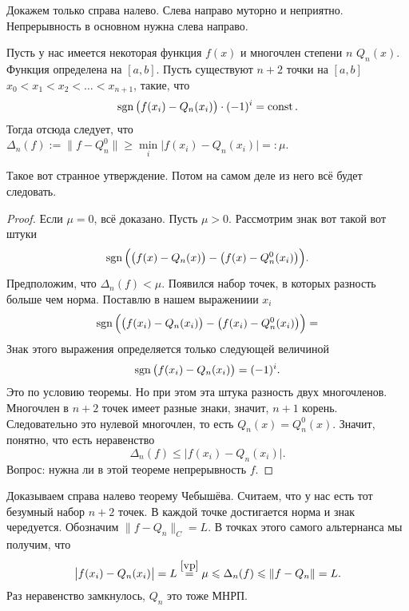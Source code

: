 \begin{Proof}
  Докажем только справа налево. Слева направо муторно и неприятно. Непрерывность в основном нужна слева направо.

  \begin{The}\label{vp}
    Пусть у нас имеется некоторая функция $f(x)$ и многочлен степени $n$ $Q_n(x)$. Функция определена на $[a,b]$. Пусть существуют $n+2$ точки на $[a,b]$ $x_0<x_1<x_2<\dots<x_{n+1}$, такие, что 
    \[
      \sgn\big( f(x_i) - Q_n(x_i)\big)\cdot (-1)^i = \const.
    \]
    Тогда отсюда следует, что $\Delta_n(f):=\|f-Q_n^0\|\ge \min\limits_i\big|f(x_i)-Q_n(x_i)\big|=:\mu$.
  \end{The}
  Такое вот странное утверждение. Потом на самом деле из него всё будет следовать.
  \begin{proof}
    Если $\mu=0$, всё доказано. Пусть $\mu>0$. Рассмотрим знак вот такой вот штуки
    \[
      \sgn \Big(\big(f(x) - Q_n(x)\big) - \big(f(x) - Q_n^0(x_i)\big)\Big).
    \]
    Предположим, что $\Delta_n(f)<\mu$. Появился набор точек, в которых разность больше чем норма. Поставлю в нашем выражениии $x_i$
    \[
      \sgn \Big(\big(f(x_i) - Q_n(x_i)\big) - \big(f(x_i) - Q_n^0(x_i)\big)\Big)=
    \]
    Знак этого выражения определяется только следующей величиной
    \[
      \sgn\big( f(x_i) - Q_n(x_i)\big) = (-1)^i.
    \]
    Это по условию теоремы. Но при этом эта штука разность двух многочленов. Многочлен в $n+2$ точек имеет разные знаки, значит, $n+1$ корень. Следовательно это нулевой многочлен, то есть $Q_n(x) = Q_n^0(x)$. Значит, понятно, что есть неравенство 
    \[
      \Delta_n(f)\le \big|f(x_i) - Q_n(x_i)\big|.
    \]
    Вопрос: нужна ли в этой теореме непрерывность $f$.
  \end{proof}
  Доказываем справа налево теорему Чебышёва. Считаем, что у нас есть тот безумный набор $n+2$ точек. В каждой точке достигается норма и знак чередуется. Обозначим $\|f - Q_n\|_C = L$. В точках этого самого альтернанса мы получим, что
  \[
     \big| f(x_i) - Q_n(x_i)\big| = L \overset{\ref{vp}}= \mu \le \Delta_n(f)\le \|f - Q_n\| = L.
  \]
  Раз неравенство замкнулось, $Q_n$ это тоже МНРП.
\end{Proof}

